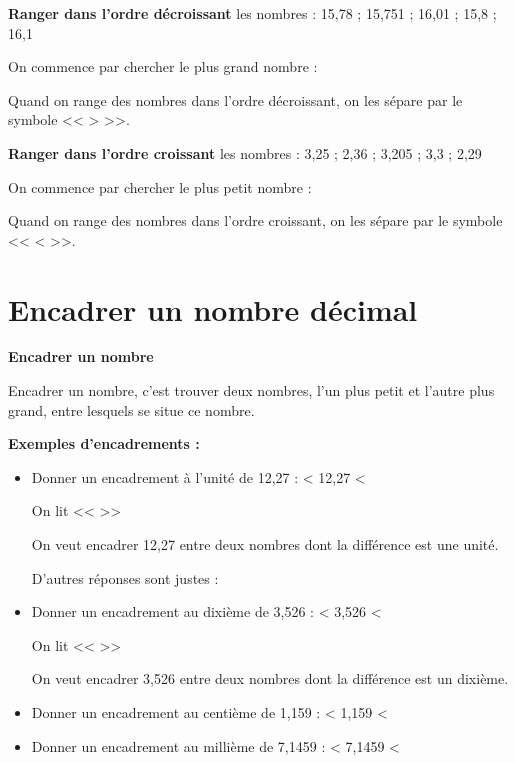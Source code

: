 \begin{examplebox}
	\textbf{Ranger dans l'ordre décroissant} les nombres : 15,78 ; 15,751 ; 16,01 ; 15,8 ; 16,1
	
	On commence par chercher le plus grand nombre : \trous{3cm}
	
	\trous{15cm}
	
	Quand on range des nombres dans l'ordre décroissant, on les sépare par le symbole << > >>.
\end{examplebox}

\begin{examplebox}
	\textbf{Ranger dans l'ordre croissant} les nombres : 3,25 ; 2,36 ; 3,205 ; 3,3 ; 2,29
	
	On commence par chercher le plus petit nombre : \trous{3cm}
	
	\trous{15cm}
	
	Quand on range des nombres dans l'ordre croissant, on les sépare par le symbole << < >>.
\end{examplebox}

\section{Encadrer un nombre décimal}

\begin{definitionbox}
	\textbf{Encadrer un nombre}
	
	Encadrer un nombre, c'est trouver deux nombres, l'un plus petit et l'autre plus grand, entre lesquels se situe ce nombre.
\end{definitionbox}

\begin{examplebox}
	\textbf{Exemples d'encadrements :}
	\begin{itemize}
		\item Donner un encadrement à l'unité de 12,27 : \trous{4cm} < 12,27 < \trous{4cm}
		
		On lit << \trous{5cm} >>
		
		On veut encadrer 12,27 entre deux nombres dont la différence est une unité.
		
		D'autres réponses sont justes : \trous{6cm}
		
		\item Donner un encadrement au dixième de 3,526 : \trous{4cm} < 3,526 < \trous{4cm}
		
		On lit << \trous{5cm} >>
		
		On veut encadrer 3,526 entre deux nombres dont la différence est un dixième.
		
		\item Donner un encadrement au centième de 1,159 : \trous{4cm} < 1,159 < \trous{4cm}
		
		\item Donner un encadrement au millième de 7,1459 : \trous{4cm} < 7,1459 < \trous{4cm}
	\end{itemize}
\end{examplebox}

